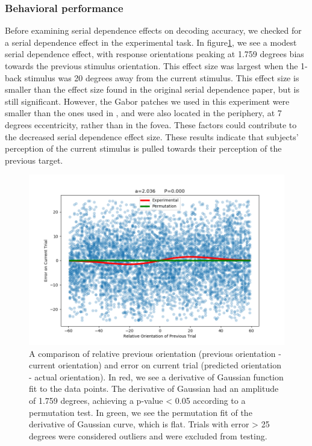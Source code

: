 \documentclass[../main.tex]{subfiles}
\begin{document}
\subsubsection{Behavioral performance}
Before examining serial dependence effects on decoding accuracy, we checked for a serial dependence effect in the experimental task. In figure\ref{DoG}, we see a modest serial dependence effect, with response orientations peaking at 1.759 degrees bias towards the previous stimulus orientation. This effect size was largest when the 1-back stimulus was 20 degrees away from the current stimulus. This effect size is smaller than the effect size found in the original \cite{fischer_whitney_2014} serial dependence paper, but is still significant. However, the Gabor patches we used in this experiment were smaller than the ones used in \cite{fischer_whitney_2014}, and were also located in the periphery, at 7 degrees eccentricity, rather than in the fovea. These factors could contribute to the decreased serial dependence effect size. These results indicate that subjects' perception of the current stimulus is pulled towards their perception of the previous target.

\begin{figure}
    \centering
    \includegraphics[scale=0.7]{figures/results/DoG_plot_v2.png}
    \caption{A comparison of relative previous orientation (previous orientation - current orientation) and error on current trial (predicted orientation - actual orientation). In red, we see a derivative of Gaussian function fit to the data points. The derivative of Gaussian had an amplitude of 1.759 degrees, achieving a p-value < 0.05 according to a permutation test. In green, we see the permutation fit of the derivative of Gaussian curve, which is flat. Trials with error > 25 degrees were considered outliers and were excluded from testing. }
    \label{DoG}
\end{figure}
\end{document}

